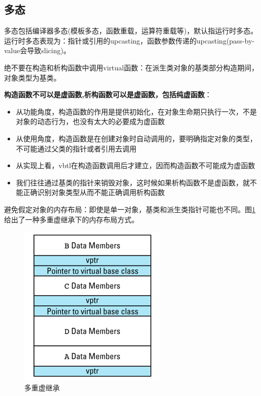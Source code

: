 \subsection{多态}
多态包括编译器多态(模板多态，函数重载，运算符重载等)，默认指运行时多态。
运行时多态表现为：指针或引用的upcasting，函数参数传递的upcasting(pass-by-value会导致slicing)。

绝不要在构造和析构函数中调用virtual函数：在派生类对象的基类部分构造期间，对象类型为基类。

\textbf{构造函数不可以是虚函数,析构函数可以是虚函数，包括纯虚函数}：
\begin{itemize}
    \item 从功能角度，构造函数的作用是提供初始化，在对象生命期只执行一次，不是对象的动态行为，也没有太大的必要成为虚函数
    \item 从使用角度，构造函数是在创建对象时自动调用的，要明确指定对象的类型，不可能通过父类的指针或者引用去调用
    \item 从实现上看，vbtl在构造函数调用后才建立，因而构造函数不可能成为虚函数
    \item 我们往往通过基类的指针来销毁对象，这时候如果析构函数不是虚函数，就不能正确识别对象类型从而不能正确调用析构函数
\end{itemize}

避免假定对象的内存布局：即使是单一对象，基类和派生类指针可能也不同。图\ref{fig:mi-vptr}给出了一种多重虚继承下的内存布局方式。

\begin{figure}[ht]
	\begin{center}
		\includegraphics[keepaspectratio,width=0.2\paperwidth]{Pictures/mi-vptr.png}
	\caption{多重虚继承}
	\label{fig:mi-vptr}
	\end{center}
\end{figure}


